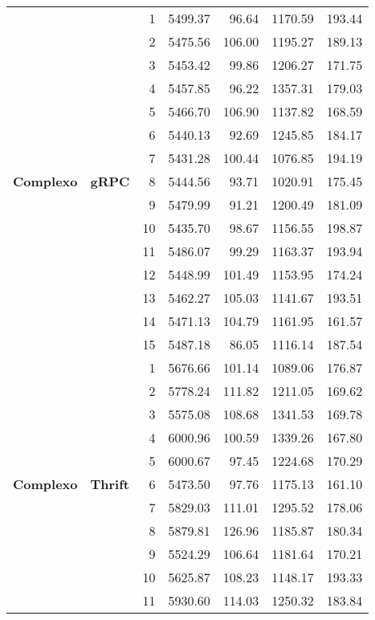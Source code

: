 \begin{longtable}{@{} llrrrrr @{}}
    \multirow{15}{*}{\textbf{Complexo}} & \multirow{15}{*}{\textbf{gRPC}} 
        & 1 & 5499.37 & 96.64 & 1170.59 & 193.44 \\
        & & 2 & 5475.56 & 106.00 & 1195.27 & 189.13 \\
        & & 3 & 5453.42 & 99.86 & 1206.27 & 171.75 \\
        & & 4 & 5457.85 & 96.22 & 1357.31 & 179.03 \\
        & & 5 & 5466.70 & 106.90 & 1137.82 & 168.59 \\
        & & 6 & 5440.13 & 92.69 & 1245.85 & 184.17 \\
        & & 7 & 5431.28 & 100.44 & 1076.85 & 194.19 \\
        & & 8 & 5444.56 & 93.71 & 1020.91 & 175.45 \\
        & & 9 & 5479.99 & 91.21 & 1200.49 & 181.09 \\
        & & 10 & 5435.70 & 98.67 & 1156.55 & 198.87 \\
        & & 11 & 5486.07 & 99.29 & 1163.37 & 193.94 \\
        & & 12 & 5448.99 & 101.49 & 1153.95 & 174.24 \\
        & & 13 & 5462.27 & 105.03 & 1141.67 & 193.51 \\
        & & 14 & 5471.13 & 104.79 & 1161.95 & 161.57 \\
        & & 15 & 5487.18 & 86.05 & 1116.14 & 187.54 \\
    \cline{2-7}
    \multirow{15}{*}{\textbf{Complexo}} & \multirow{15}{*}{\textbf{Thrift}} 
        & 1 & 5676.66 & 101.14 & 1089.06 & 176.87 \\
        & & 2 & 5778.24 & 111.82 & 1211.05 & 169.62 \\
        & & 3 & 5575.08 & 108.68 & 1341.53 & 169.78 \\
        & & 4 & 6000.96 & 100.59 & 1339.26 & 167.80 \\
        & & 5 & 6000.67 & 97.45 & 1224.68 & 170.29 \\
        & & 6 & 5473.50 & 97.76 & 1175.13 & 161.10 \\
        & & 7 & 5829.03 & 111.01 & 1295.52 & 178.06 \\
        & & 8 & 5879.81 & 126.96 & 1185.87 & 180.34 \\
        & & 9 & 5524.29 & 106.64 & 1181.64 & 170.21 \\
        & & 10 & 5625.87 & 108.23 & 1148.17 & 193.33 \\
        & & 11 & 5930.60 & 114.03 & 1250.32 & 183.84 \\

\end{longtable}
